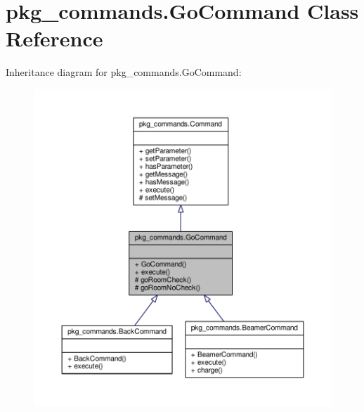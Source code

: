 \hypertarget{classpkg__commands_1_1GoCommand}{\section{pkg\-\_\-commands.\-Go\-Command Class Reference}
\label{classpkg__commands_1_1GoCommand}
}


Inheritance diagram for pkg\-\_\-commands.\-Go\-Command\-:
\nopagebreak
\begin{figure}[H]
\begin{center}
\leavevmode
\includegraphics[width=350pt]{classpkg__commands_1_1GoCommand__inherit__graph}
\end{center}
\end{figure}


